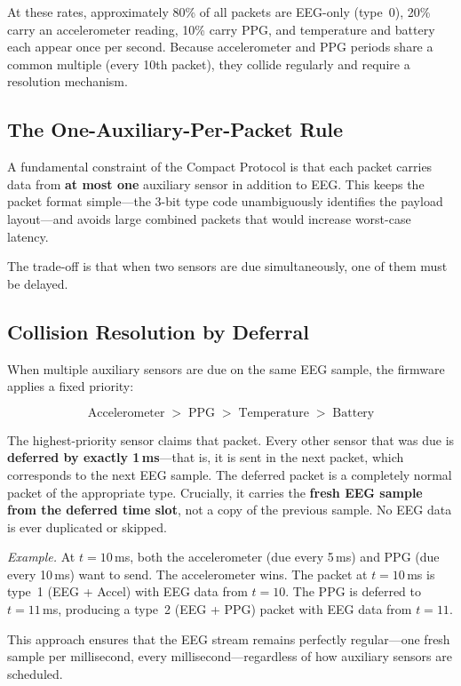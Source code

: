 \documentclass[11pt,a4paper]{article}
\begin{document}
At these rates, approximately 80\% of all packets are EEG-only (type~0), 20\% carry an accelerometer reading, 10\% carry PPG, and temperature and battery each appear once per second.  Because accelerometer and PPG periods share a common multiple (every 10th packet), they collide regularly and require a resolution mechanism.

\subsection{The One-Auxiliary-Per-Packet Rule}

A fundamental constraint of the Compact Protocol is that each packet carries data from \textbf{at most one} auxiliary sensor in addition to EEG.  This keeps the packet format simple---the 3-bit type code unambiguously identifies the payload layout---and avoids large combined packets that would increase worst-case latency.

The trade-off is that when two sensors are due simultaneously, one of them must be delayed.

\subsection{Collision Resolution by Deferral}
\label{sec:deferral}

When multiple auxiliary sensors are due on the same EEG sample, the firmware applies a fixed priority:

\[
\text{Accelerometer} \;>\; \text{PPG} \;>\; \text{Temperature} \;>\; \text{Battery}
\]

The highest-priority sensor claims that packet.  Every other sensor that was due is \textbf{deferred by exactly 1\,ms}---that is, it is sent in the next packet, which corresponds to the next EEG sample.  The deferred packet is a completely normal packet of the appropriate type.  Crucially, it carries the \textbf{fresh EEG sample from the deferred time slot}, not a copy of the previous sample.  No EEG data is ever duplicated or skipped.

\medskip
\noindent
\textit{Example.}  At $t = 10$\,ms, both the accelerometer (due every 5\,ms) and PPG (due every 10\,ms) want to send.  The accelerometer wins.  The packet at $t = 10$\,ms is type~1 (EEG + Accel) with EEG data from $t = 10$.  The PPG is deferred to $t = 11$\,ms, producing a type~2 (EEG + PPG) packet with EEG data from $t = 11$.

\medskip
This approach ensures that the EEG stream remains perfectly regular---one fresh sample per millisecond, every millisecond---regardless of how auxiliary sensors are scheduled.
\end{document}
